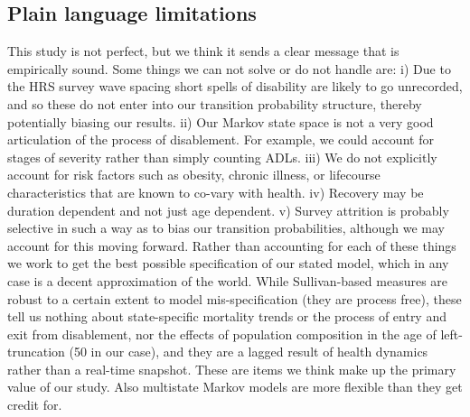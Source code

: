 \subsection{Plain language limitations}
This study is not perfect, but we think it sends a clear message that is empirically sound. Some things we can not solve or do not handle are: i) Due to the HRS survey wave spacing short spells of disability are likely to go unrecorded, and so these do not enter into our transition probability structure, thereby potentially biasing our results. ii) Our Markov state space is not a very good articulation of the process of disablement. For example, we could account for stages of severity rather than simply counting ADLs. iii) We do not explicitly account for risk factors such as obesity, chronic illness, or lifecourse characteristics that are known to co-vary with health. iv) Recovery may be duration dependent and not just age dependent. v) Survey attrition is probably selective in such a way as to bias our transition probabilities, although we may account for this moving forward. Rather than accounting for each of these things we work to get the best possible specification of our stated model, which in any case is a decent approximation of the world. While Sullivan-based measures are robust to a certain extent to model mis-specification (they are process free), these tell us nothing about state-specific mortality trends or the process of entry and exit from disablement, nor the effects of population composition in the age of left-truncation (50 in our case), and they are a lagged result of health dynamics rather than a real-time snapshot. These are items we think make up the primary value of our study. Also multistate Markov models are more flexible than they get credit for.

